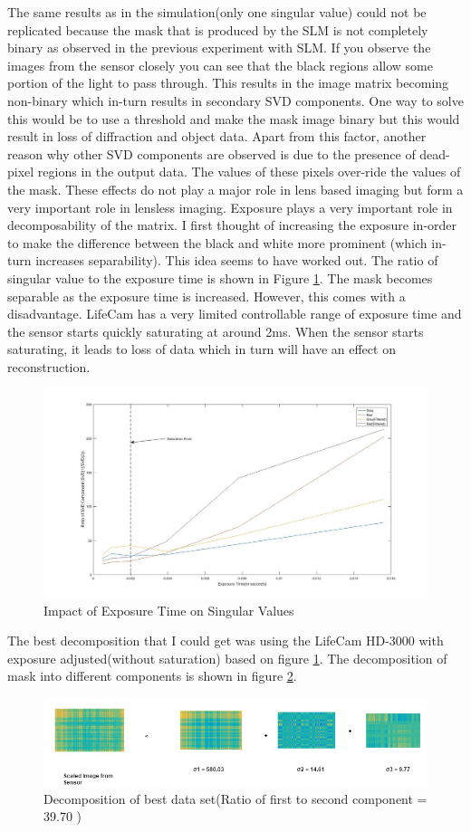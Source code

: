 The same results as in the simulation(only one singular value) could not be replicated because the mask that is produced by the SLM is not completely binary as observed in the previous experiment with SLM. If you observe the images from the sensor closely you can see that the black regions allow some portion of the light to pass through. This results in the image matrix becoming non-binary which in-turn results in secondary SVD components. One way to solve this would be to use a threshold and make the mask image binary but this would result in loss of diffraction and object data. Apart from this factor, another reason why other SVD components are observed is due to the presence of dead-pixel regions in the output data. The values of these pixels over-ride the values of the mask. These effects do not play a major role in lens based imaging but form a very important role in lensless imaging. Exposure plays a very important role in decomposability of the matrix. I first thought of increasing the exposure in-order to make the difference between the black and white more prominent (which in-turn increases separability). This idea seems to have worked out. The ratio of singular value to the exposure time is shown in Figure \ref{fig:svd_exposure}. The mask becomes separable as the exposure time is increased. However, this comes with a disadvantage. LifeCam has a very limited controllable range of exposure time and the sensor starts quickly saturating at around 2ms. When the sensor starts saturating, it leads to loss of data which in turn will have an effect on reconstruction. 
\begin{figure}[h]
\centering
\includegraphics[width = \linewidth]{pics/slm/svd_graph_exposure.jpg}
\caption{Impact of Exposure Time on Singular Values}
\label{fig:svd_exposure}
\end{figure}
The best decomposition that I could get was using the LifeCam HD-3000 with exposure adjusted(without saturation) based on figure \ref{fig:svd_exposure}. The decomposition of mask into different components is shown in figure \ref{fig:svd_dec_exp}. 
\begin{figure}[ht]
\centering
\includegraphics[width = \linewidth]{pics/slm/svd-decomp-exp.png}
\caption{Decomposition of best data set(Ratio of first to second component = 39.70 )}
\label{fig:svd_dec_exp}
\end{figure}